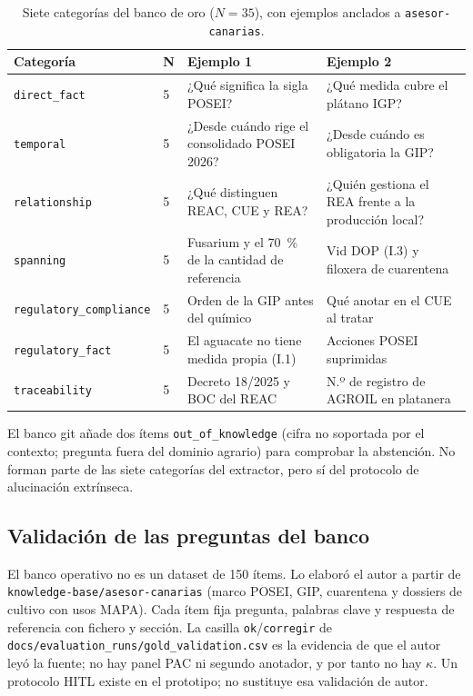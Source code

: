 \begin{table}[htbp]
\centering
\caption{Siete categorías del banco de oro ($N=35$), con ejemplos anclados a \texttt{asesor-canarias}.}
\label{tab:categories}
\small
\begin{tabular}{llp{5.4cm}p{5.0cm}}
\toprule
\textbf{Categoría} & \textbf{N} & \textbf{Ejemplo 1} & \textbf{Ejemplo 2} \\
\midrule
\texttt{direct\_fact} & 5 & ¿Qué significa la sigla POSEI? & ¿Qué medida cubre el plátano IGP? \\
\texttt{temporal} & 5 & ¿Desde cuándo rige el consolidado POSEI 2026? & ¿Desde cuándo es obligatoria la GIP? \\
\texttt{relationship} & 5 & ¿Qué distinguen REAC, CUE y REA? & ¿Quién gestiona el REA frente a la producción local? \\
\texttt{spanning} & 5 & Fusarium y el 70~\% de la cantidad de referencia & Vid DOP (I.3) y filoxera de cuarentena \\
\texttt{regulatory\_compliance} & 5 & Orden de la GIP antes del químico & Qué anotar en el CUE al tratar \\
\texttt{regulatory\_fact} & 5 & El aguacate no tiene medida propia (I.1) & Acciones POSEI suprimidas \\
\texttt{traceability} & 5 & Decreto 18/2025 y BOC del REAC & N.º de registro de AGROIL en platanera \\
\bottomrule
\end{tabular}
\end{table}

El banco git añade dos ítems \texttt{out\_of\_knowledge} (cifra no soportada por el contexto; pregunta fuera del dominio agrario) para comprobar la abstención. No forman parte de las siete categorías del extractor, pero sí del protocolo de alucinación extrínseca.

\subsection*{Validación de las preguntas del banco}
El banco operativo no es un dataset de 150 ítems. Lo elaboró el autor a partir de \texttt{knowledge-base/asesor-canarias} (marco POSEI, GIP, cuarentena y dossiers de cultivo con usos MAPA). Cada ítem fija pregunta, palabras clave y respuesta de referencia con fichero y sección. La casilla \texttt{ok}/\texttt{corregir} de \texttt{docs/evaluation\_runs/gold\_validation.csv} es la evidencia de que el autor leyó la fuente; no hay panel PAC ni segundo anotador, y por tanto no hay $\kappa$. Un protocolo HITL existe en el prototipo; no sustituye esa validación de autor.

